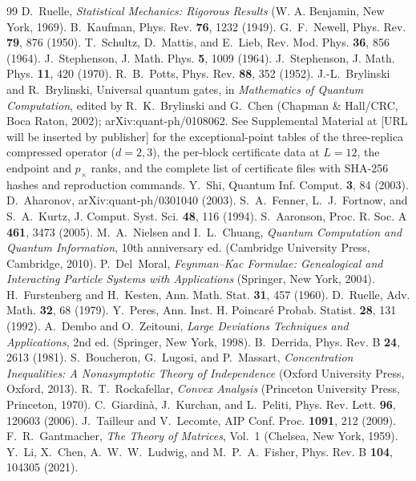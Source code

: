 \documentclass[aps,prx,reprint,superscriptaddress,nobibnotes,longbibliography]{revtex4-2}
\theoremstyle{remark}
\begin{document}
\begin{thebibliography}{99}
 D.~Ruelle, \emph{Statistical Mechanics: Rigorous Results} (W. A. Benjamin, New York, 1969).
 B.~Kaufman, Phys. Rev. \textbf{76}, 1232 (1949).
 G.~F.~Newell, Phys. Rev. \textbf{79}, 876 (1950).
 T.~Schultz, D.~Mattis, and E.~Lieb, Rev. Mod. Phys. \textbf{36}, 856 (1964).
 J.~Stephenson, J. Math. Phys. \textbf{5}, 1009 (1964).
 J.~Stephenson, J. Math. Phys. \textbf{11}, 420 (1970).
 R.~B.~Potts, Phys. Rev. \textbf{88}, 352 (1952).
 J.-L.~Brylinski and R.~Brylinski, Universal quantum gates, in \emph{Mathematics of Quantum Computation}, edited by R.~K.~Brylinski and G.~Chen (Chapman \& Hall/CRC, Boca Raton, 2002); arXiv:quant-ph/0108062.
 See Supplemental Material at [URL will be inserted by publisher] for the exceptional-point tables of the three-replica compressed operator ($d=2,3$), the per-block certificate data at $L=12$, the endpoint and $p_\times$ ranks, and the complete list of certificate files with SHA-256 hashes and reproduction commands.
 Y.~Shi, Quantum Inf. Comput. \textbf{3}, 84 (2003).
 D.~Aharonov, arXiv:quant-ph/0301040 (2003).
 S.~A.~Fenner, L.~J.~Fortnow, and S.~A.~Kurtz, J. Comput. Syst. Sci. \textbf{48}, 116 (1994).
 S.~Aaronson, Proc. R. Soc. A \textbf{461}, 3473 (2005).
 M.~A.~Nielsen and I.~L.~Chuang, \emph{Quantum Computation and Quantum Information}, 10th anniversary ed. (Cambridge University Press, Cambridge, 2010).
 P.~Del~Moral, \emph{Feynman--Kac Formulae: Genealogical and Interacting Particle Systems with Applications} (Springer, New York, 2004).
 H.~Furstenberg and H.~Kesten, Ann. Math. Stat. \textbf{31}, 457 (1960).
 D.~Ruelle, Adv. Math. \textbf{32}, 68 (1979).
 Y.~Peres, Ann. Inst. H. Poincar\'e Probab. Statist. \textbf{28}, 131 (1992).
 A.~Dembo and O.~Zeitouni, \emph{Large Deviations Techniques and Applications}, 2nd ed. (Springer, New York, 1998).
 B.~Derrida, Phys. Rev. B \textbf{24}, 2613 (1981).
 S.~Boucheron, G.~Lugosi, and P.~Massart, \emph{Concentration Inequalities: A Nonasymptotic Theory of Independence} (Oxford University Press, Oxford, 2013).
 R.~T.~Rockafellar, \emph{Convex Analysis} (Princeton University Press, Princeton, 1970).
 C.~Giardin\`a, J.~Kurchan, and L.~Peliti, Phys. Rev. Lett. \textbf{96}, 120603 (2006).
 J.~Tailleur and V.~Lecomte, AIP Conf. Proc. \textbf{1091}, 212 (2009).
 F.~R.~Gantmacher, \emph{The Theory of Matrices}, Vol.~1 (Chelsea, New York, 1959).
 Y.~Li, X.~Chen, A.~W.~W.~Ludwig, and M.~P.~A.~Fisher, Phys. Rev. B \textbf{104}, 104305 (2021).
\end{thebibliography}
\end{document}
